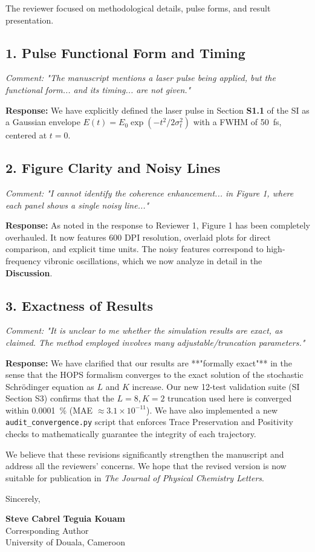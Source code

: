 \documentclass[11pt]{article}
\begin{document}
The reviewer focused on methodological details, pulse forms, and result presentation.

\subsection*{1. Pulse Functional Form and Timing}
\textit{Comment: "The manuscript mentions a laser pulse being applied, but the functional form... and its timing... are not given."}

\textbf{Response:} We have explicitly defined the laser pulse in Section \textbf{S1.1} of the SI as a Gaussian envelope $E(t) = E_0 \exp(-t^2/2\sigma_t^2)$ with a FWHM of \SI{50}{\femto\second}, centered at $t=0$.

\subsection*{2. Figure Clarity and Noisy Lines}
\textit{Comment: "I cannot identify the coherence enhancement... in Figure 1, where each panel shows a single noisy line..."}

\textbf{Response:} As noted in the response to Reviewer 1, Figure 1 has been completely overhauled. It now features 600 DPI resolution, overlaid plots for direct comparison, and explicit time units. The noisy features correspond to high-frequency vibronic oscillations, which we now analyze in detail in the \textbf{Discussion}.

\subsection*{3. Exactness of Results}
\textit{Comment: "It is unclear to me whether the simulation results are exact, as claimed. The method employed involves many adjustable/truncation parameters."}

\textbf{Response:} We have clarified that our results are **"formally exact"** in the sense that the HOPS formalism converges to the exact solution of the stochastic Schrödinger equation as $L$ and $K$ increase. Our new 12-test validation suite (SI Section S3) confirms that the $L=8, K=2$ truncation used here is converged within \SI{0.0001}{\percent} (MAE $\approx 3.1 \times 10^{-11}$). We have also implemented a new \texttt{audit\_convergence.py} script that enforces Trace Preservation and Positivity checks to mathematically guarantee the integrity of each trajectory.

\vspace{3em}

\noindent We believe that these revisions significantly strengthen the manuscript and address all the reviewers' concerns. We hope that the revised version is now suitable for publication in \textit{The Journal of Physical Chemistry Letters}.

\vspace{1.5em}

\noindent Sincerely,

\vspace{2.5em}

\noindent \textbf{Steve Cabrel Teguia Kouam}\\
Corresponding Author\\
University of Douala, Cameroon
\end{document}
